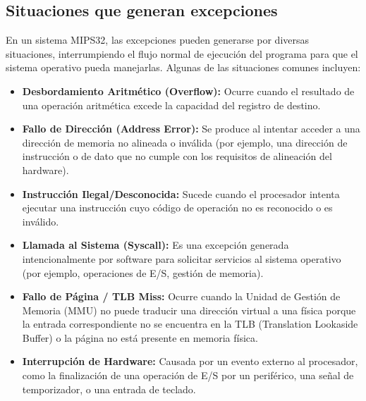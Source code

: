 \documentclass[12pt,a4paper]{article}
\begin{document}
	\subsection{Situaciones que generan excepciones}
	En un sistema MIPS32, las excepciones pueden generarse por diversas situaciones, interrumpiendo el flujo normal de ejecución del programa para que el sistema operativo pueda manejarlas. Algunas de las situaciones comunes incluyen:
	\begin{itemize}
		\item \textbf{Desbordamiento Aritmético (Overflow):} Ocurre cuando el resultado de una operación aritmética excede la capacidad del registro de destino.
		\item \textbf{Fallo de Dirección (Address Error):} Se produce al intentar acceder a una dirección de memoria no alineada o inválida (por ejemplo, una dirección de instrucción o de dato que no cumple con los requisitos de alineación del hardware).
		\item \textbf{Instrucción Ilegal/Desconocida:} Sucede cuando el procesador intenta ejecutar una instrucción cuyo código de operación no es reconocido o es inválido.
		\item \textbf{Llamada al Sistema (Syscall):} Es una excepción generada intencionalmente por software para solicitar servicios al sistema operativo (por ejemplo, operaciones de E/S, gestión de memoria).
		\item \textbf{Fallo de Página / TLB Miss:} Ocurre cuando la Unidad de Gestión de Memoria (MMU) no puede traducir una dirección virtual a una física porque la entrada correspondiente no se encuentra en la TLB (Translation Lookaside Buffer) o la página no está presente en memoria física.
		\item \textbf{Interrupción de Hardware:} Causada por un evento externo al procesador, como la finalización de una operación de E/S por un periférico, una señal de temporizador, o una entrada de teclado.
	\end{itemize}
	
\end{document}
